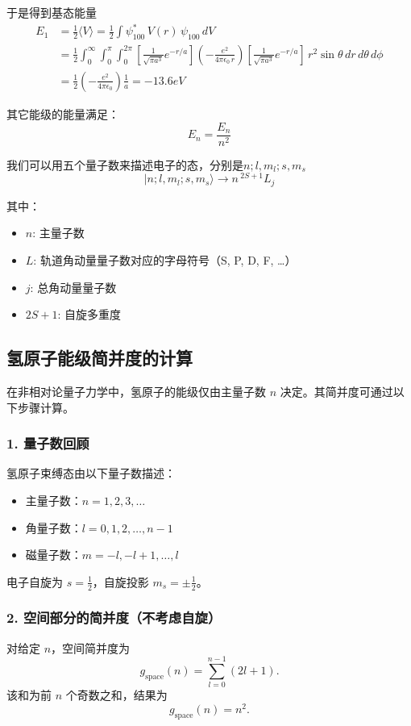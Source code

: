 于是得到基态能量
\begin{align}
	E_1&=\frac{1}{2}\langle V \rangle = \frac{1}{2}\int \psi_{100}^* \, V(r) \, \psi_{100} \, dV \nonumber\\
	&= \frac{1}{2}\int_0^\infty \int_0^\pi \int_0^{2\pi} 
	\left[ \frac{1}{\sqrt{\pi a^3}} e^{-r/a} \right] 
	\left( -\frac{e^2}{4\pi\epsilon_0 \, r} \right) 
	\left[ \frac{1}{\sqrt{\pi a^3}} e^{-r/a} \right] 
	\, r^2 \sin\theta \, dr \, d\theta \, d\phi \\
	&= \frac{1}{2} (-\frac{e^2}{4\pi\epsilon_0}) \frac{1}{a} =-13.6 eV\nonumber
\end{align}

其它能级的能量满足：
\[{E_n} = \frac{{{E_n}}}{{{n^2}}}\]

我们可以用五个量子数来描述电子的态，分别是\(n;l,m_l;s,m_s\)
\[
|n;l,m_l;s,m_s\rangle \longrightarrow n\,^{2S+1}L_j
\]

其中：
\begin{itemize}
	\item $n$: 主量子数
	\item $L$: 轨道角动量量子数对应的字母符号（S, P, D, F, \ldots）
	\item $j$: 总角动量量子数
	\item $2S+1$: 自旋多重度
\end{itemize}
\subsection{氢原子能级简并度的计算}

在非相对论量子力学中，氢原子的能级仅由主量子数 \( n \) 决定。其简并度可通过以下步骤计算。

\subsubsection*{1. 量子数回顾}
氢原子束缚态由以下量子数描述：
\begin{itemize}
	\item 主量子数：\( n = 1, 2, 3, \dots \)
	\item 角量子数：\( l = 0, 1, 2, \dots, n-1 \)
	\item 磁量子数：\( m = -l, -l+1, \dots, l \)
\end{itemize}
电子自旋为 \( s = \frac{1}{2} \)，自旋投影 \( m_s = \pm \frac{1}{2} \)。

\subsubsection*{2. 空间部分的简并度（不考虑自旋）}
对给定 \( n \)，空间简并度为
\[
g_{\text{space}}(n) = \sum_{l=0}^{n-1} (2l + 1).
\]
该和为前 \( n \) 个奇数之和，结果为
\[
g_{\text{space}}(n) = n^2.
\]

